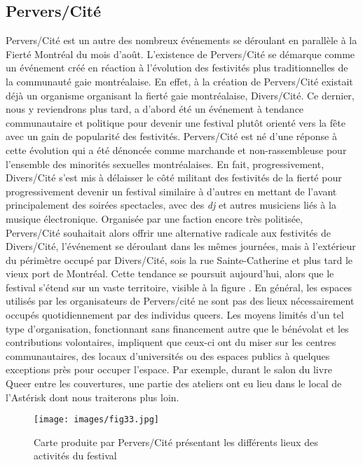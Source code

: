 \subsection{Pervers/Cité}
\label{subsec:perverscite}
Pervers/Cité est un autre des nombreux événements se déroulant en parallèle à la Fierté Montréal du mois d'août.
L'existence de Pervers/Cité se démarque comme un événement créé en réaction à l'évolution des festivités plus traditionnelles de la communauté gaie montréalaise.
En effet, à la création de Pervers/Cité existait déjà un organisme organisant la fierté gaie montréalaise, Divers/Cité.
Ce dernier, nous y reviendrons plus tard, a d'abord été un événement à tendance communautaire et politique pour devenir une festival plutôt orienté vers la fête avec un gain de popularité des festivités.
Pervers/Cité est né d'une réponse à cette évolution qui a été dénoncée comme marchande et non-rassembleuse pour l'ensemble des minorités sexuelles montréalaises.
En fait, progressivement, Divers/Cité s'est mis à délaisser le côté militant des festivités de la fierté pour progressivement devenir un festival similaire à d'autres en mettant de l'avant principalement des soirées spectacles, avec des \emph{dj} et autres musiciens liés à la musique électronique.
Organisée par une faction encore très politisée, Pervers/Cité souhaitait alors offrir une alternative radicale aux festivités de Divers/Cité, l'événement se déroulant dans les mêmes journées, mais à l'extérieur du périmètre occupé par Divers/Cité, sois la rue Sainte-Catherine et plus tard le vieux port de Montréal.
Cette tendance se poursuit aujourd'hui, alors que le festival s'étend sur un vaste territoire, visible à la figure .
En général, les espaces utilisés par les organisateurs de Pervers/cité ne sont pas des lieux nécessairement occupés quotidiennement par des individus queers.
Les moyens limités d'un tel type d'organisation, fonctionnant sans financement autre que le bénévolat et les contributions volontaires, impliquent que ceux-ci ont du miser sur les centres communautaires, des locaux d'universités ou des espaces publics à quelques exceptions près pour occuper l'espace.
Par exemple, durant le salon du livre Queer entre les couvertures, une partie des ateliers ont eu lieu dans le local de l'Astérisk dont nous traiterons plus loin.

\begin{figure}[ht]
	\centering
	\texttt{[image: images/fig33.jpg]}
	\caption{Carte produite par Pervers/Cité présentant les différents lieux des activités du festival}\label{fig:carte_perverscite}
\end{figure}

